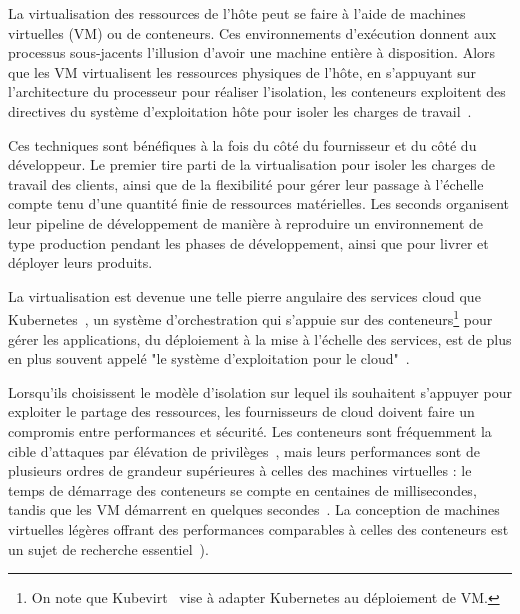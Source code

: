 La virtualisation des ressources de l'hôte peut se faire à l'aide de machines virtuelles (VM) ou de conteneurs. Ces environnements d'exécution donnent aux processus sous-jacents l'illusion d'avoir une machine entière à disposition. Alors que les VM virtualisent les ressources physiques de l'hôte, en s'appuyant sur l'architecture du processeur pour réaliser l'isolation, les conteneurs exploitent des directives du système d'exploitation hôte pour isoler les charges de travail~\cite{mancoMyVMLighter2017}.

Ces techniques sont bénéfiques à la fois du côté du fournisseur et du côté du développeur. Le premier tire parti de la virtualisation pour isoler les charges de travail des clients, ainsi que de la flexibilité pour gérer leur passage à l'échelle compte tenu d'une quantité finie de ressources matérielles. Les seconds organisent leur pipeline de développement de manière à reproduire un environnement de type production pendant les phases de développement, ainsi que pour livrer et déployer leurs produits.

La virtualisation est devenue une telle pierre angulaire des services cloud que Kubernetes~\cite{kubernetes}, un système d'orchestration qui s'appuie sur des conteneurs\footnote{On note que Kubevirt~\cite{kubevirt} vise à adapter Kubernetes au déploiement de VM.} pour gérer les applications, du déploiement à la mise à l'échelle des services, est de plus en plus souvent appelé "le système d'exploitation pour le cloud"~\cite{jonreeve2018kubernetes}.

Lorsqu'ils choisissent le modèle d'isolation sur lequel ils souhaitent s'appuyer pour exploiter le partage des ressources, les fournisseurs de cloud doivent faire un compromis entre performances et sécurité. Les conteneurs sont fréquemment la cible d'attaques par élévation de privilèges~\cite{zomer2022containers, redhat2019containers}, mais leurs performances sont de plusieurs ordres de grandeur supérieures à celles des machines virtuelles : le temps de démarrage des conteneurs se compte en centaines de millisecondes, tandis que les VM démarrent en quelques secondes~\cite{mancoMyVMLighter2017}. La conception de machines virtuelles légères offrant des performances comparables à celles des conteneurs est un sujet de recherche essentiel~\cite{agacheFirecrackerLightweightVirtualization, Anjali2020BlendingCA}).

